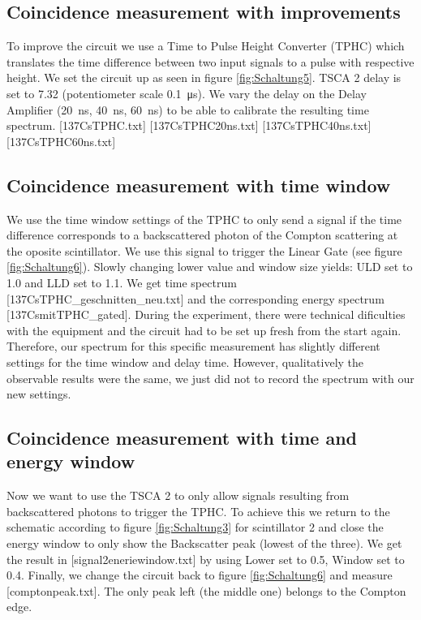 \subsection{Coincidence measurement with improvements}
%
To improve the circuit we use a Time to Pulse Height Converter (TPHC) which translates the time difference between two input signals to a pulse with respective height.
We set the circuit up as seen in figure \ref{fig:Schaltung5}.
TSCA 2 delay is set to 7.32 (potentiometer scale \SI{0.1}{\micro\second}).
We vary the delay on the Delay Amplifier (\SI{20}{\nano\second}, \SI{40}{\nano\second}, \SI{60}{\nano\second}) to be able to calibrate the resulting time spectrum.
[137CsTPHC.txt]
[137CsTPHC20ns.txt]
[137CsTPHC40ns.txt]
[137CsTPHC60ns.txt]
%
\subsection{Coincidence measurement with time window}
%
We use the time window settings of the TPHC to only send a signal if the time difference corresponds to a backscattered photon of the Compton scattering at the oposite scintillator.
We use this signal to trigger the Linear Gate (see figure \ref{fig:Schaltung6}).
Slowly changing lower value and window size yields: ULD set to 1.0 and LLD set to 1.1.
We get time spectrum [137CsTPHC\_geschnitten\_neu.txt] and the corresponding energy spectrum [137CsmitTPHC\_gated].
During the experiment, there were technical dificulties with the equipment and the circuit had to be set up fresh from the start again.
Therefore, our spectrum for this specific measurement has slightly different settings for the time window and delay time.
However, qualitatively the observable results were the same, we just did not to record the spectrum with our new settings.
%
\subsection{Coincidence measurement with time and energy window}
%
Now we want to use the TSCA 2 to only allow signals resulting from backscattered photons to trigger the TPHC.
To achieve this we return to the schematic according to figure \ref{fig:Schaltung3} for scintillator 2 and close the energy window to only show the Backscatter peak (lowest of the three).
We get the result in [signal2eneriewindow.txt] by using Lower set to 0.5, Window set to 0.4.
Finally, we change the circuit back to figure \ref{fig:Schaltung6} and measure [comptonpeak.txt].
The only peak left (the middle one) belongs to the Compton edge.
%
